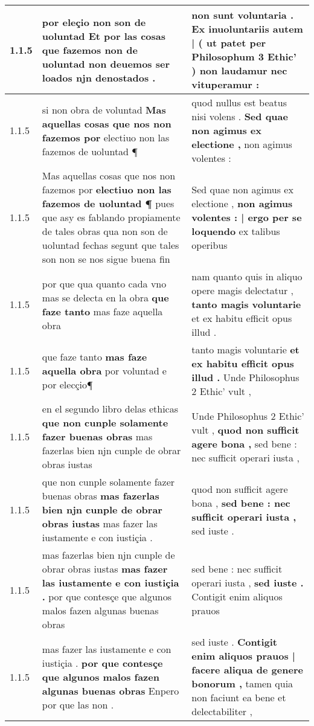 \begin{tabular}{|p{1cm}|p{6.5cm}|p{6.5cm}|}
1.1.5 & por eleçio non son de uoluntad \textbf{ Et por las cosas que fazemos non de uoluntad } non deuemos ser loados njn denostados . & non sunt voluntaria . \textbf{ Ex inuoluntariis autem | ( ut patet per Philosophum 3 Ethic’ ) } non laudamur nec vituperamur : \\\hline
1.1.5 & si non obra de voluntad \textbf{ Mas aquellas cosas que nos non fazemos por } electiuo non las fazemos de uoluntad ¶ & quod nullus est beatus nisi volens . \textbf{ Sed quae non agimus ex electione , } non agimus volentes : \\\hline
1.1.5 & Mas aquellas cosas que nos non fazemos por \textbf{ electiuo non las fazemos de uoluntad ¶ } pues que asy es fablando propiamente de tales obras qua non son de uoluntad fechas segunt que tales son non se nos sigue buena fin & Sed quae non agimus ex electione , \textbf{ non agimus volentes : | ergo per se loquendo } ex talibus operibus \\\hline
1.1.5 & por que qua quanto cada vno mas se delecta en la obra \textbf{ que faze tanto } mas faze aquella obra & nam quanto quis in aliquo opere magis delectatur , \textbf{ tanto magis voluntarie } et ex habitu efficit opus illud . \\\hline
1.1.5 & que faze tanto \textbf{ mas faze aquella obra } por voluntad e por elecçio¶ & tanto magis voluntarie \textbf{ et ex habitu efficit opus illud . } Unde Philosophus 2 Ethic’ vult , \\\hline
1.1.5 & en el segundo libro delas ethicas \textbf{ que non cunple solamente fazer buenas obras } mas fazerlas bien njn cunple de obrar obras iustas & Unde Philosophus 2 Ethic’ vult , \textbf{ quod non sufficit agere bona , } sed bene : nec sufficit operari iusta , \\\hline
1.1.5 & que non cunple solamente fazer buenas obras \textbf{ mas fazerlas bien njn cunple de obrar obras iustas } mas fazer las iustamente e con iustiçia . & quod non sufficit agere bona , \textbf{ sed bene : nec sufficit operari iusta , } sed iuste . \\\hline
1.1.5 & mas fazerlas bien njn cunple de obrar obras iustas \textbf{ mas fazer las iustamente e con iustiçia . } por que contesçe que algunos malos fazen algunas buenas obras & sed bene : nec sufficit operari iusta , \textbf{ sed iuste . } Contigit enim aliquos prauos \\\hline
1.1.5 & mas fazer las iustamente e con iustiçia . \textbf{ por que contesçe que algunos malos fazen algunas buenas obras } Enpero por que las non . & sed iuste . \textbf{ Contigit enim aliquos prauos | facere aliqua de genere bonorum , } tamen quia non faciunt ea bene et delectabiliter , \\\hline

\end{tabular}
